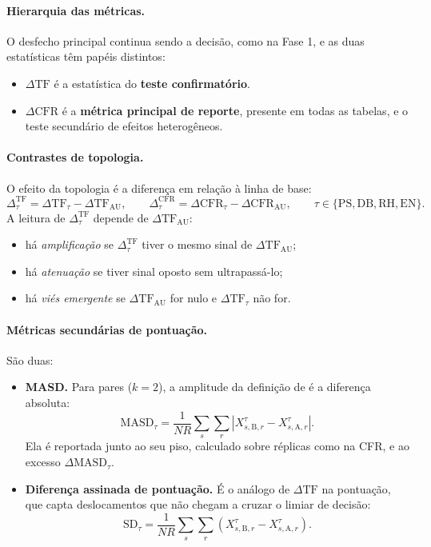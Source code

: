 \documentclass[12pt]{article}
\newcommand{\CFR}{\mathrm{CFR}}
\newcommand{\MASD}{\mathrm{MASD}}
\newcommand{\SD}{\mathrm{SD}}
\begin{document}
\paragraph{Hierarquia das métricas.} O desfecho principal continua sendo a decisão, como na Fase 1, e as duas estatísticas têm papéis distintos:
\begin{itemize}
    \item $\Delta\mathrm{TF}$ é a estatística do \textbf{teste confirmatório}.
    \item $\Delta\CFR$ é a \textbf{métrica principal de reporte}, presente em todas as tabelas, e o teste secundário de efeitos heterogêneos.
\end{itemize}

\paragraph{Contrastes de topologia.} O efeito da topologia é a diferença em relação à linha de base:
\begin{equation}
\Delta^{\mathrm{TF}}_\tau=\Delta\mathrm{TF}_\tau-\Delta\mathrm{TF}_{\mathrm{AU}},\qquad
\Delta^{\CFR}_\tau=\Delta\CFR_\tau-\Delta\CFR_{\mathrm{AU}},\qquad \tau\in\{\mathrm{PS},\mathrm{DB},\mathrm{RH},\mathrm{EN}\}.
\label{eq:contraste}
\end{equation}
A leitura de $\Delta^{\mathrm{TF}}_\tau$ depende de $\Delta\mathrm{TF}_{\mathrm{AU}}$:
\begin{itemize}
    \item há \emph{amplificação} se $\Delta^{\mathrm{TF}}_\tau$ tiver o mesmo sinal de $\Delta\mathrm{TF}_{\mathrm{AU}}$;
    \item há \emph{atenuação} se tiver sinal oposto sem ultrapassá-lo;
    \item há \emph{viés emergente} se $\Delta\mathrm{TF}_{\mathrm{AU}}$ for nulo e $\Delta\mathrm{TF}_\tau$ não for.
\end{itemize}

\paragraph{Métricas secundárias de pontuação.} São duas:
\begin{itemize}
    \item \textbf{MASD.} Para pares ($k=2$), a amplitude da definição de \citet{morla2026agentfairbench} é a diferença absoluta:
    \begin{equation}
    \MASD_\tau=\frac{1}{NR}\sum_s\sum_r\left|X^\tau_{s,\mathrm{B},r}-X^\tau_{s,\mathrm{A},r}\right| .
    \end{equation}
    Ela é reportada junto ao seu piso, calculado sobre réplicas como na CFR, e ao excesso $\Delta\MASD_\tau$.
    \item \textbf{Diferença assinada de pontuação.} É o análogo de $\Delta\mathrm{TF}$ na pontuação, que capta deslocamentos que não chegam a cruzar o limiar de decisão:
    \begin{equation}
    \SD_\tau=\frac{1}{NR}\sum_s\sum_r\left(X^\tau_{s,\mathrm{B},r}-X^\tau_{s,\mathrm{A},r}\right).
    \end{equation}
\end{itemize}
\end{document}

